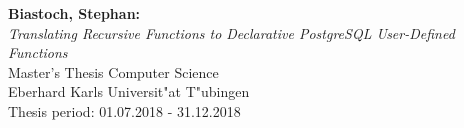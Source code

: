 \documentclass[twoside,10pt,a4paper]{report}
\begin{document}

\thispagestyle{empty}
\vspace*{\fill}
\begin{minipage}{11.2cm}
\textbf{Biastoch, Stephan:}\\
\emph{Translating Recursive Functions to Declarative PostgreSQL User-Defined Functions}\\ Master's Thesis Computer Science\\
Eberhard Karls Universit"at T"ubingen\\
Thesis period: 01.07.2018 - 31.12.2018
\end{minipage}
\newpage


\setcounter{page}{1}





%
\newpage


\renewcommand{\baselinestretch}{1.3}
\small\normalsize

\tableofcontents

\renewcommand{\baselinestretch}{1}
\small\normalsize

\cleardoublepage






\end{document}
